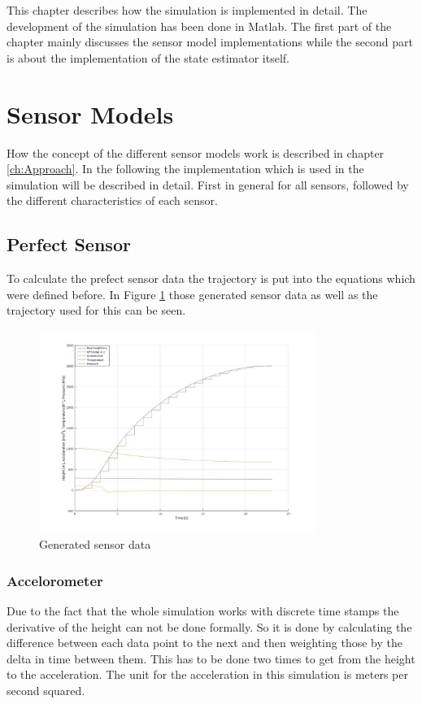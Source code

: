 This chapter describes how the simulation is implemented in detail.
The development of the simulation has been done in Matlab.
The first part of the chapter mainly discusses the sensor model implementations while the second part is about the implementation of the state estimator itself.

\section{Sensor Models}
How the concept of the different sensor models work is described in chapter \ref{ch:Approach}.
In the following the implementation which is used in the simulation will be described in detail.
First in general for all sensors, followed by the different characteristics of each sensor.

\subsection{Perfect Sensor}
To calculate the prefect sensor data the trajectory is put into the equations which were defined before.
In Figure \ref{fig:GeneratedPerfectSensor} those generated sensor data as well as the trajectory used for this can be seen.

\begin{figure}[h!]
 \centering
 \includegraphics[width=0.8\textwidth]{./Pictures/GeneratedSensorData.jpg}
 \caption{Generated sensor data}
 \label{fig:GeneratedPerfectSensor}
\end{figure}

\newpage
\subsubsection{Accelorometer}
Due to the fact that the whole simulation works with discrete time stamps the derivative of the height can not be done formally.
So it is done by calculating the difference between each data point to the next and then weighting those by the delta in time between them.
This has to be done two times to get from the height to the acceleration.
The unit for the acceleration in this simulation is meters per second squared.

